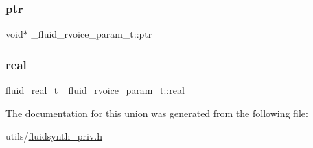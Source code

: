 \subsubsection{\texorpdfstring{ptr}{ptr}}
{\footnotesize\ttfamily void$\ast$ \+\_\+fluid\+\_\+rvoice\+\_\+param\+\_\+t\+::ptr}

\mbox{\label{union__fluid__rvoice__param__t_a37c385c55d50be836b0b7116a42b5c8f}} 
\subsubsection{\texorpdfstring{real}{real}}
{\footnotesize\ttfamily \hyperlink{fluidsynth__priv_8h_a9e96f0917747b69cabb7c671bc693dbb}{fluid\+\_\+real\+\_\+t} \+\_\+fluid\+\_\+rvoice\+\_\+param\+\_\+t\+::real}



The documentation for this union was generated from the following file\+:\begin{DoxyCompactItemize}
\item 
utils/\hyperlink{fluidsynth__priv_8h}{fluidsynth\+\_\+priv.\+h}\end{DoxyCompactItemize}
